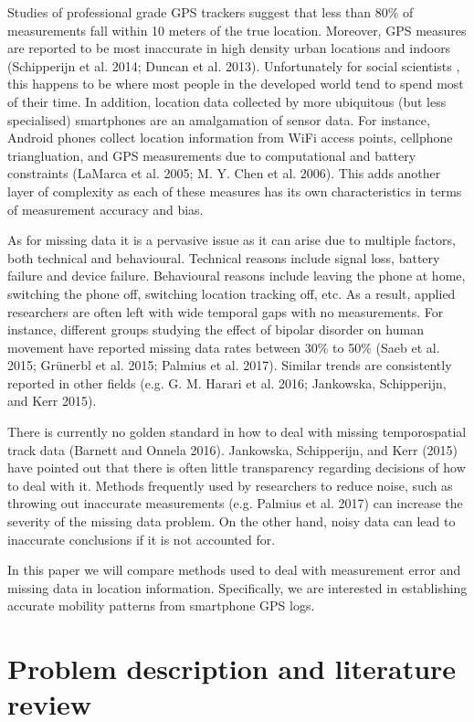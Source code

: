 \documentclass[]{article}
\begin{document}
Studies of professional grade GPS trackers suggest that less than 80\%
of measurements fall within 10 meters of the true location. Moreover,
GPS measures are reported to be most inaccurate in high density urban
locations and indoors (Schipperijn et al. 2014; Duncan et al. 2013).
Unfortunately for social scientists , this happens to be where most
people in the developed world tend to spend most of their time. In
addition, location data collected by more ubiquitous (but less
specialised) smartphones are an amalgamation of sensor data. For
instance, Android phones collect location information from WiFi access
points, cellphone triangluation, and GPS measurements due to
computational and battery constraints (LaMarca et al. 2005; M. Y. Chen
et al. 2006). This adds another layer of complexity as each of these
measures has its own characteristics in terms of measurement accuracy
and bias.

As for missing data it is a pervasive issue as it can arise due to
multiple factors, both technical and behavioural. Technical reasons
include signal loss, battery failure and device failure. Behavioural
reasons include leaving the phone at home, switching the phone off,
switching location tracking off, etc. As a result, applied researchers
are often left with wide temporal gaps with no measurements. For
instance, different groups studying the effect of bipolar disorder on
human movement have reported missing data rates between 30\% to 50\%
(Saeb et al. 2015; Grünerbl et al. 2015; Palmius et al. 2017). Similar
trends are consistently reported in other fields (e.g. G. M. Harari et
al. 2016; Jankowska, Schipperijn, and Kerr 2015).

There is currently no golden standard in how to deal with missing
temporospatial track data (Barnett and Onnela 2016). Jankowska,
Schipperijn, and Kerr (2015) have pointed out that there is often little
transparency regarding decisions of how to deal with it. Methods
frequently used by researchers to reduce noise, such as throwing out
inaccurate measurements (e.g. Palmius et al. 2017) can increase the
severity of the missing data problem. On the other hand, noisy data can
lead to inaccurate conclusions if it is not accounted for.

In this paper we will compare methods used to deal with measurement
error and missing data in location information. Specifically, we are
interested in establishing accurate mobility patterns from smartphone
GPS logs.

\section{Problem description and literature
review}\label{problem-description-and-literature-review}
\end{document}
